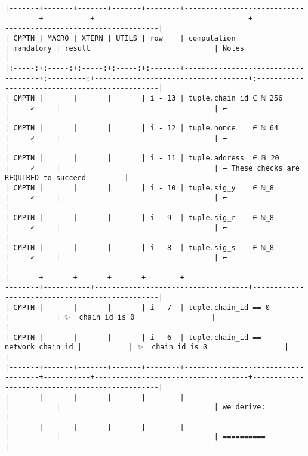 \documentclass[varwidth=\maxdimen,margin=0.5cm,multi={verbatim}]{standalone}
\begin{document}
\begin{verbatim}
|-------+-------+-------+-------+--------+------------------------------------+-----------+------------------------------------+------------------------------------------------|
| CMPTN | MACRO | XTERN | UTILS | row    | computation                        | mandatory | result                             | Notes                                          |
|:-----:+:-----:+:-----:+:-----:+:-------+------------------------------------+:---------:+------------------------------------+:-----------------------------------------------|
| CMPTN |       |       |       | i - 13 | tuple.chain_id ∈ ℕ_256             |     ✓     |                                    | ←                                              |
| CMPTN |       |       |       | i - 12 | tuple.nonce    ∈ ℕ_64              |     ✓     |                                    | ←                                              |
| CMPTN |       |       |       | i - 11 | tuple.address  ∈ 𝔹_20              |     ✓     |                                    | ← These checks are REQUIRED to succeed         |
| CMPTN |       |       |       | i - 10 | tuple.sig_y    ∈ ℕ_8               |     ✓     |                                    | ←                                              |
| CMPTN |       |       |       | i - 9  | tuple.sig_r    ∈ ℕ_8               |     ✓     |                                    | ←                                              |
| CMPTN |       |       |       | i - 8  | tuple.sig_s    ∈ ℕ_8               |     ✓     |                                    | ←                                              |
|-------+-------+-------+-------+--------+------------------------------------+-----------+------------------------------------+------------------------------------------------|
| CMPTN |       |       |       | i - 7  | tuple.chain_id == 0                |           | ✨  chain_id_is_0                  |                                                |
| CMPTN |       |       |       | i - 6  | tuple.chain_id == network_chain_id |           | ✨  chain_id_is_β                  |                                                |
|-------+-------+-------+-------+--------+------------------------------------+-----------+------------------------------------+------------------------------------------------|
|       |       |       |       |        |                                    |           |                                    | we derive:                                     |
|       |       |       |       |        |                                    |           |                                    | ==========                                     |

\end{verbatim}
\end{document}
